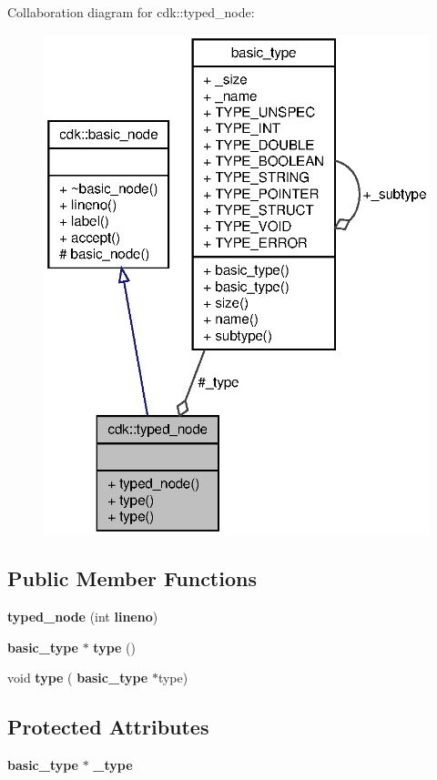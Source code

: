 Collaboration diagram for cdk\+:\+:typed\+\_\+node\+:
\nopagebreak
\begin{figure}[H]
\begin{center}
\leavevmode
\includegraphics[width=322pt]{classcdk_1_1typed__node__coll__graph}
\end{center}
\end{figure}
\subsection*{Public Member Functions}
\begin{DoxyCompactItemize}
\item 
\textbf{ typed\+\_\+node} (int \textbf{ lineno})
\item 
\mbox{\label{classcdk_1_1typed__node_a80085cd019a406db0d86e90b6f571fe5}} 
\textbf{ basic\+\_\+type} $\ast$ {\bfseries type} ()
\item 
\mbox{\label{classcdk_1_1typed__node_acde6a228f9fd7634f3e5ad1bcc4f524c}} 
void {\bfseries type} (\textbf{ basic\+\_\+type} $\ast$type)
\end{DoxyCompactItemize}
\subsection*{Protected Attributes}
\begin{DoxyCompactItemize}
\item 
\mbox{\label{classcdk_1_1typed__node_a24c4c1179878df9ec6807aa31f4d7c8d}} 
\textbf{ basic\+\_\+type} $\ast$ {\bfseries \+\_\+type}
\end{DoxyCompactItemize}
